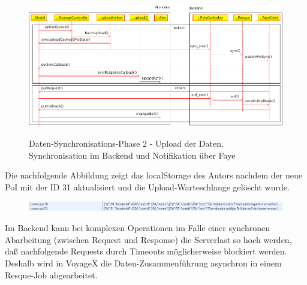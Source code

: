   \begin{figure}[H]
  	\begin{adjustwidth}{-1.5cm}{1.5cm}
      \centering
  	  \includegraphics[scale=0.7]{bilder/uml/syncPoiNoteQueue.png} \\
  	  \caption{Daten-Synchronisations-Phase 2 - Upload der Daten, Synchronisation im Backend und Notifikation über Faye}
  	\end{adjustwidth}
  \end{figure}
\noindent
Die nachfolgende Abbildung zeigt das localStorage des Autors nachdem der neue PoI mit der ID 31 aktualisiert und die Upload-Warteschlange gelöscht wurde.
  \begin{figure}[H]
  	\begin{adjustwidth}{-0.8cm}{0.8cm}
      \centering
  	  \includegraphics[scale=0.7]{bilder/screenshots/queue_localStrorage_2.png}
  	\end{adjustwidth}
  \end{figure}
\noindent
Im Backend kann bei komplexen Operationen im Falle einer synchronen Abarbeitung (zwischen Request und Response) die Serverlast so hoch werden, daß nachfolgende Requests durch Timeouts möglicherweise blockiert werden. Deshalb wird in VoyageX die Daten-Zusammenführung asynchron in einem Resque-Job abgearbeitet.

